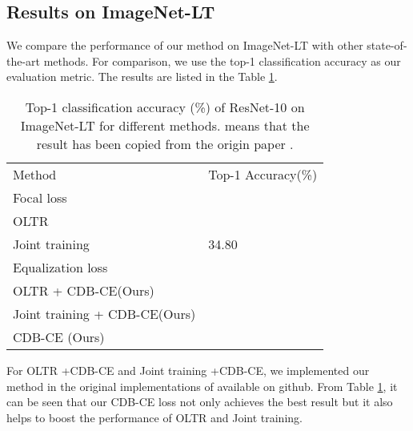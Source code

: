 \documentclass[runningheads]{llncs}
\begin{document}
\subsection{Results on ImageNet-LT}
We compare the performance of our method on ImageNet-LT with other state-of-the-art methods. For comparison, we use the top-1 classification accuracy as our evaluation metric. The results are listed in the Table \ref{table:ImageNet1}.
\setlength{\tabcolsep}{4pt}
\begin{table}[tp]
\begin{center}
\caption{
Top-1 classification accuracy (\%) of ResNet-10 on ImageNet-LT for different methods.  means that the result has been copied from the origin paper \cite{Equalizationloss,OLTR,decoupling}.
}
\label{table:ImageNet1}
\begin{tabular}{ll}
\hline\noalign{\smallskip}
Method & Top-1 Accuracy(\%)\\
\noalign{\smallskip}
\hline
\noalign{\smallskip}
Focal loss  \cite{FOCALloss} &\\
OLTR  \cite{OLTR} &\\
Joint training  \cite{decoupling} & 34.80\\
Equalization loss  \cite{Equalizationloss} &\\
OLTR \cite{OLTR} + CDB-CE(Ours) & \\
Joint training \cite{decoupling}+ CDB-CE(Ours)& \\
CDB-CE (Ours) &\\
\hline
\end{tabular}
\end{center}
\end{table}
\setlength{\tabcolsep}{1.4pt}

For OLTR \cite{OLTR}+CDB-CE and Joint training \cite{decoupling}+CDB-CE, we 
implemented our method in the original implementations of \cite{OLTR,decoupling} 
available on github. From Table \ref{table:ImageNet1}, it can be seen that our 
CDB-CE loss not only achieves the best result but it also helps to boost the 
performance of OLTR and Joint training. 
\end{document}

